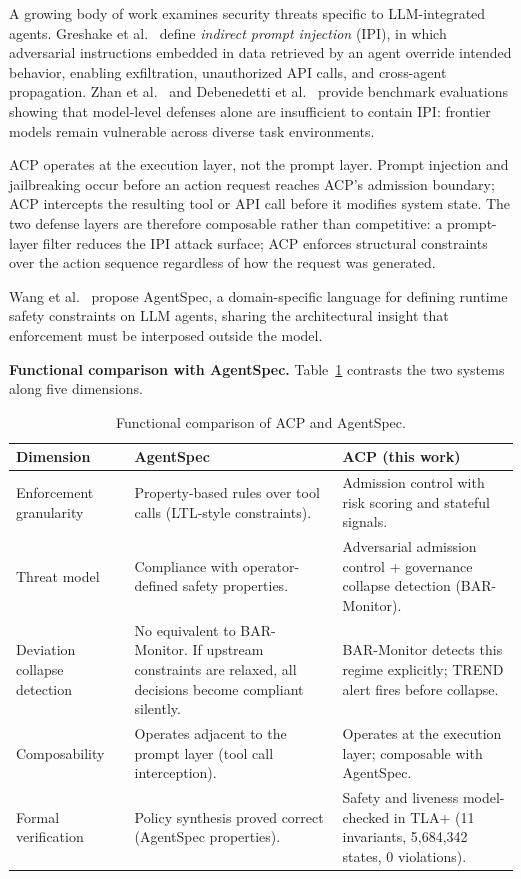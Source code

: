 \documentclass[11pt]{article}
\theoremstyle{definition}
\begin{document}
A growing body of work examines security threats specific to LLM-integrated agents.
Greshake et al.~\cite{greshake2023not} define \emph{indirect prompt injection} (IPI),
in which adversarial instructions embedded in data retrieved by an agent override
intended behavior, enabling exfiltration, unauthorized API calls, and cross-agent
propagation.
Zhan et al.~\cite{zhan2024injecagent} and Debenedetti et al.~\cite{debenedetti2024agentdojo}
provide benchmark evaluations showing that model-level defenses alone are insufficient to
contain IPI: frontier models remain vulnerable across diverse task environments.

ACP operates at the execution layer, not the prompt layer.
Prompt injection and jailbreaking occur before an action request reaches ACP's admission
boundary; ACP intercepts the resulting tool or API call before it modifies system state.
The two defense layers are therefore composable rather than competitive: a
prompt-layer filter reduces the IPI attack surface; ACP enforces structural constraints
over the action sequence regardless of how the request was generated.

Wang et al.~\cite{wang2025agentspec} propose AgentSpec, a domain-specific language for
defining runtime safety constraints on LLM agents, sharing the architectural insight that
enforcement must be interposed outside the model.

\textbf{Functional comparison with AgentSpec.}
Table~\ref{tab:agentspec-comparison} contrasts the two systems along five dimensions.

\begin{table}[h!]
\centering\small
\caption{Functional comparison of ACP and AgentSpec.}
\label{tab:agentspec-comparison}
\begin{tabular}{@{}p{3.5cm}p{4.5cm}p{4.5cm}@{}}
\toprule
Dimension & AgentSpec & ACP (this work) \\
\midrule
Enforcement granularity &
  Property-based rules over tool calls (LTL-style constraints). &
  Admission control with risk scoring and stateful signals. \\
\midrule
Threat model &
  Compliance with operator-defined safety properties. &
  Adversarial admission control + governance collapse detection (BAR-Monitor). \\
\midrule
Deviation collapse detection &
  No equivalent to BAR-Monitor. If upstream constraints are relaxed, all decisions
  become compliant silently. &
  BAR-Monitor detects this regime explicitly; TREND alert fires before collapse. \\
\midrule
Composability &
  Operates adjacent to the prompt layer (tool call interception). &
  Operates at the execution layer; composable with AgentSpec. \\
\midrule
Formal verification &
  Policy synthesis proved correct (AgentSpec properties). &
  Safety and liveness model-checked in TLA+ (11 invariants, 5,684,342 states, 0 violations). \\
\bottomrule
\end{tabular}
\end{table}
\end{document}
